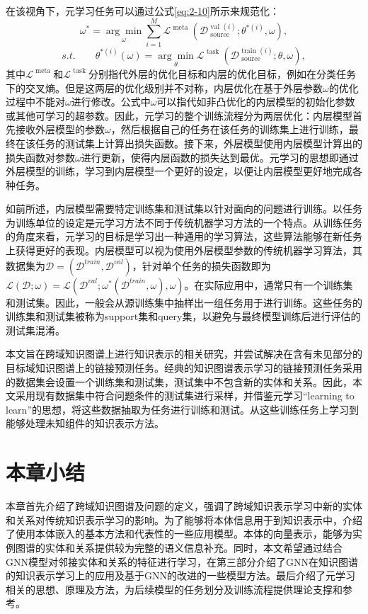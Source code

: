   在该视角下，元学习任务可以通过公式\ref{eq:2-10}所示来规范化：
\begin{equation}
  \omega ^ { * } = \underset { \omega } { \operatorname { arg } \operatorname { min } } \sum_{i=1}^{M} \mathcal{L} ^ { \text { meta } } ( \mathcal{D} _ { \text { source } } ^ { \text { val } ( i ) } ; \theta ^ { * ( i ) } , \omega ), \label{eq:2-10}
\end{equation}
\begin{equation}
  s.t. \qquad \theta ^ { * ( i ) } ( \omega ) = \underset { \theta } { \operatorname { arg } \operatorname { min } } \mathcal{L} ^ { \text { task } } ( \mathcal{D} _ { \text { source } } ^ { \text { train } ( i ) } ; \theta , \omega ), \label{eq:2-11}
\end{equation}
其中\(\mathcal{L} ^ { \text { meta } }\)和\(\mathcal{L} ^ { \text { task } }\)分别指代外层的优化目标和内层的优化目标，例如在分类任务下的交叉熵。但是这两层的优化级别并不对称，内层优化在基于外层参数\(\omega\)的优化过程中不能对\(\omega\)进行修改。公式中\(\omega\)可以指代如非凸优化\cite{finn2017model}的内层模型的初始化参数或其他可学习的超参数。因此，元学习的整个训练流程分为两层优化：内层模型首先接收外层模型的参数\(\omega\)，然后根据自己的任务在该任务的训练集上进行训练，最终在该任务的测试集上计算出损失函数。接下来，外层模型使用内层模型计算出的损失函数对参数\(\omega\)进行更新，使得内层函数的损失达到最优。元学习的思想即通过外层模型的训练，学习到内层模型一个更好的设定，以便让内层模型更好地完成各种任务。

如前所述，内层模型需要特定训练集和测试集以针对面向的问题进行训练。以任务为训练单位的设定是元学习方法不同于传统机器学习方法的一个特点。从训练任务的角度来看，元学习的目标是学习出一种通用的学习算法，这些算法能够在新任务上获得更好的表现。内层模型可以视为使用外层模型参数的传统机器学习算法，其数据集为\(\mathcal{D} = (\mathcal{D}^{train}, \mathcal{D}^{val})\)，针对单个任务的损失函数即为\(\mathcal{L}(\mathcal{D};\omega) = \mathcal{L}(\mathcal{D}^{val};\omega^{*}(\mathcal{D}^{train},\omega),\omega)\)。在实际应用中，通常只有一个训练集和测试集。因此，一般会从源训练集中抽样出一组任务用于进行训练。这些任务的训练集和测试集被称为support集和query集，以避免与最终模型训练后进行评估的测试集混淆。

本文旨在跨域知识图谱上进行知识表示的相关研究，并尝试解决在含有未见部分的目标域知识图谱上的链接预测任务。经典的知识图谱表示学习的链接预测任务采用的数据集会设置一个训练集和测试集，测试集中不包含新的实体和关系。因此，本文采用现有数据集中符合问题条件的测试集进行采样，并借鉴元学习“learning to learn”的思想，将这些数据抽取为任务进行训练和测试。从这些训练任务上学习到能够处理未知组件的知识表示方法。

\section{本章小结}
本章首先介绍了跨域知识图谱及问题的定义，强调了跨域知识表示学习中新的实体和关系对传统知识表示学习的影响。为了能够将本体信息用于到知识表示中，介绍了使用本体嵌入的基本方法和代表性的一些应用模型。本体的向量表示，能够为实例图谱的实体和关系提供较为完整的语义信息补充。同时，本文希望通过结合GNN模型对邻接实体和关系的特征进行学习，在第三部分介绍了GNN在知识图谱的知识表示学习上的应用及基于GNN的改进的一些模型方法。最后介绍了元学习相关的思想、原理及方法，为后续模型的任务划分及训练流程提供理论支撑和参考。